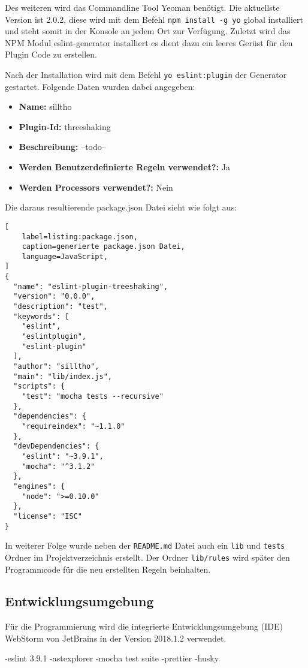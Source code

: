 Des weiteren wird das Commandline Tool Yeoman benötigt. Die aktuellste Version ist 2.0.2, diese wird mit dem Befehl \lstinline{npm install -g yo} global installiert und steht somit in der Konsole an jedem Ort zur Verfügung. Zuletzt wird das NPM Modul eslint-generator installiert es dient dazu ein leeres Gerüst für den Plugin Code zu erstellen.

Nach der Installation wird mit dem Befehl \lstinline{yo eslint:plugin} der Generator gestartet. Folgende Daten wurden dabei angegeben:
\begin{itemize}
	\item \textbf{Name:} silltho
    \item \textbf{Plugin-Id:} threeshaking
    \item \textbf{Beschreibung:} --todo--
    \item \textbf{Werden Benutzerdefinierte Regeln verwendet?:} Ja
    \item \textbf{Werden Processors verwendet?:} Nein
\end{itemize}

Die daraus resultierende package.json Datei sieht wie folgt aus:

\begin{lstlisting}[
    label=listing:package.json,
	caption=generierte package.json Datei,
	language=JavaScript,
]
{
  "name": "eslint-plugin-treeshaking",
  "version": "0.0.0",
  "description": "test",
  "keywords": [
    "eslint",
    "eslintplugin",
    "eslint-plugin"
  ],
  "author": "silltho",
  "main": "lib/index.js",
  "scripts": {
    "test": "mocha tests --recursive"
  },
  "dependencies": {
    "requireindex": "~1.1.0"
  },
  "devDependencies": {
    "eslint": "~3.9.1",
    "mocha": "^3.1.2"
  },
  "engines": {
    "node": ">=0.10.0"
  },
  "license": "ISC"
}
\end{lstlisting}

In weiterer Folge wurde neben der \lstinline{README.md} Datei auch ein \lstinline{lib} und \lstinline{tests} Ordner im Projektverzeichnis erstellt. Der Ordner \lstinline{lib/rules} wird später den Programmcode für die neu erstellten Regeln beinhalten.

\subsection{Entwicklungsumgebung}
Für die Programmierung wird die integrierte Entwicklungsumgebung (IDE) WebStorm von JetBrains in der Version 2018.1.2 verwendet. 

-eslint 3.9.1
-astexplorer
-mocha test suite
-prettier
-husky


